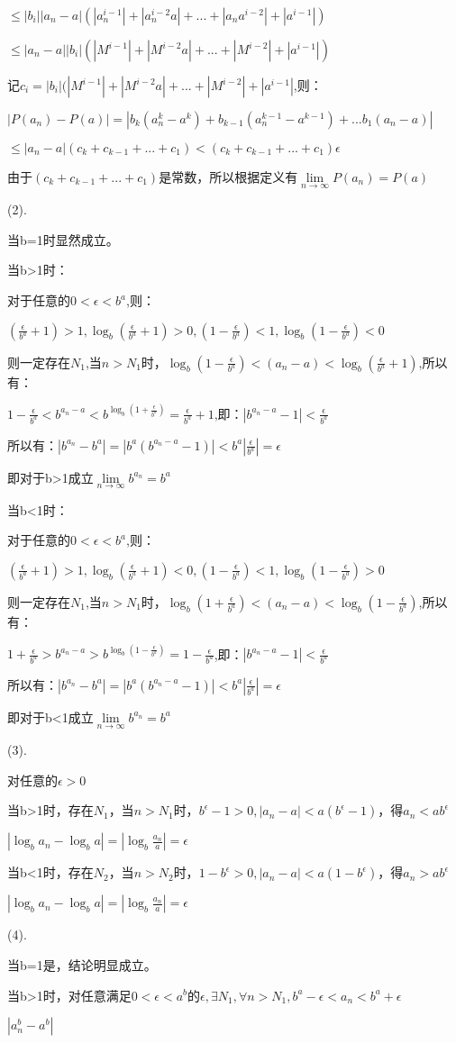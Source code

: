 \documentclass[12pt]{ctexart}
\begin{document}
$\le|b_i||a_n-a|(|a_n^{i-1}|+|a_n^{i-2}a|+...+|a_na^{i-2}|+|a^{i-1}|)$

$\le|a_n-a||b_i|(|M^{i-1}|+|M^{i-2}a|+...+|M^{i-2}|+|a^{i-1}|)$

记$c_i=|b_i|(|M^{i-1}|+|M^{i-2}a|+...+|M^{i-2}|+|a^{i-1}|$,则：

$|P(a_n)-P(a)|=|b_k(a_n^k-a^k)+b_{k-1}(a_n^{k-1}-a^{k-1})+...b_1(a_n-a)|$

$\le|a_n-a|(c_k+c_{k-1}+...+c_1)<(c_k+c_{k-1}+...+c_1)\epsilon$

由于$(c_k+c_{k-1}+...+c_1)$是常数，所以根据定义有$\lim\limits_{n\to\infty}P(a_n)=P(a)$

(2).

当b=1时显然成立。

当b>1时：

对于任意的$0<\epsilon<b^a$,则：

$(\frac{\epsilon}{b^a}+1)>1,\log_b{(\frac{\epsilon}{b^a}+1)}>0, (1-\frac{\epsilon}{b^a})<1,\log_b{(1-\frac{\epsilon}{b^a})}<0$

则一定存在$N_1$,当$n>N_1$时，$\log_b{(1-\frac{\epsilon}{b^a})}<(a_n-a)<\log_b{(\frac{\epsilon}{b^a}+1)}$,所以有：

$1-\frac{\epsilon}{b^a}<b^{a_n-a}<b^{\log_b{(1+\frac{\epsilon}{b^a})}}=\frac{\epsilon}{b^a}+1$,即：$|b^{a_n-a}-1|<\frac{\epsilon}{b^a}$

所以有：$|b^{a_n}-b^a|=|b^a(b^{a_n-a}-1)|<b^a|\frac{\epsilon}{b^a}|=\epsilon$

即对于b>1成立$\lim\limits_{n\to\infty}b^{a_n}=b^a$

当b<1时：

对于任意的$0<\epsilon<b^a$,则：

$(\frac{\epsilon}{b^a}+1)>1,\log_b{(\frac{\epsilon}{b^a}+1)}<0, (1-\frac{\epsilon}{b^a})<1,\log_b{(1-\frac{\epsilon}{b^a})}>0$

则一定存在$N_1$,当$n>N_1$时，$\log_b{(1+\frac{\epsilon}{b^a})}<(a_n-a)<\log_b{(1-\frac{\epsilon}{b^a})}$,所以有：

$1+\frac{\epsilon}{b^a}>b^{a_n-a}>b^{\log_b{(1-\frac{\epsilon}{b^a})}}=1-\frac{\epsilon}{b^a}$,即：$|b^{a_n-a}-1|<\frac{\epsilon}{b^a}$

所以有：$|b^{a_n}-b^a|=|b^a(b^{a_n-a}-1)|<b^a|\frac{\epsilon}{b^a}|=\epsilon$

即对于b<1成立$\lim\limits_{n\to\infty}b^{a_n}=b^a$

(3).

对任意的$\epsilon>0$

当b>1时，存在$N_1$，当$n>N_1$时，$b^{\epsilon}-1>0,|a_n-a|<a(b^{\epsilon}-1)$，得$a_n<ab^{\epsilon}$

$|\log_b{a_n}-\log_b{a}|=|\log_b{\frac{a_n}{a}}|=\epsilon$

当b<1时，存在$N_2$，当$n>N_2$时，$1-b^{\epsilon}>0,|a_n-a|<a(1-b^{\epsilon})$，得$a_n>ab^{\epsilon}$

$|\log_b{a_n}-\log_b{a}|=|\log_b{\frac{a_n}{a}}|=\epsilon$

(4).

当b=1是，结论明显成立。

当b>1时，对任意满足$0<\epsilon<a^b$的$\epsilon,\exists{N_1},\forall{n>N_1},b^a-\epsilon<a_n<b^a+\epsilon$

$|a_n^b-a^b|$
\end{document}
